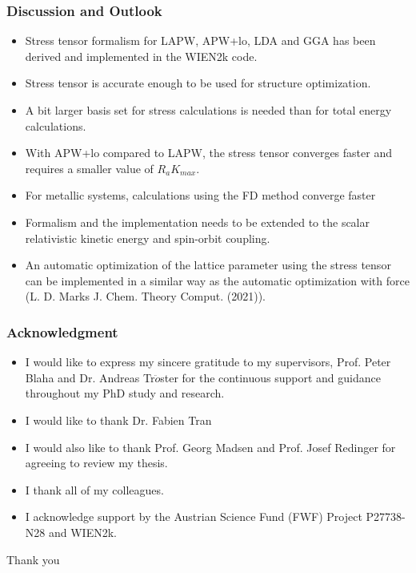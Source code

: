 \documentclass[10pt, handout]{beamer}
\begin{document}
\begin{frame}
	\frametitle{Discussion and Outlook}
	\begin{itemize}
		\item Stress tensor formalism for LAPW, APW+lo, LDA and GGA has been derived  and implemented in the WIEN2k code.
		\item Stress tensor is accurate enough to be used for structure optimization.
		\item A bit larger basis set for stress calculations is needed than for total energy calculations.
		\item With APW+lo compared to LAPW, the stress tensor converges faster and requires a smaller value of $R_aK_{max}$.
		\item For metallic systems, calculations using the FD method converge faster 
		\item Formalism and the implementation needs to be extended to the scalar relativistic kinetic energy and spin-orbit coupling.
		\item An automatic optimization of the lattice parameter using the stress tensor can be implemented in a similar way as the automatic optimization with force (L. D. Marks J. Chem. Theory Comput. (2021)).
	\end{itemize}
\end{frame}

\begin{frame}
	\frametitle{Acknowledgment}
	\small{
	\begin{itemize}
		\item I would like to express my sincere gratitude to my supervisors, Prof. Peter Blaha and Dr. Andreas Tr$\ddot{o}$ster for the continuous support	and guidance throughout my PhD study and research. 		
		\item I would like to thank Dr. Fabien Tran %
		\item I would also like to thank Prof. Georg Madsen and Prof. Josef Redinger  for agreeing to review my thesis.
		\item I thank all of my colleagues.
		\item I acknowledge support by the Austrian Science Fund (FWF) Project P27738-N28 and WIEN2k.
	\end{itemize}	
    }
	\begin{center}
	\begin{tcolorbox}[colframe=red!75!black, colback=black!10, width=\linewidth/2]
		\begin{center}
			\Huge Thank you
		\end{center}	
	\end{tcolorbox}
    \end{center}
\end{frame}
	
\end{document}

